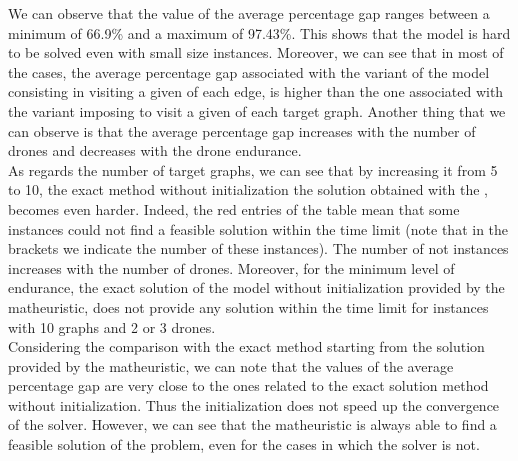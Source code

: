 We can observe that the value of the average percentage gap ranges between a minimum of 66.9\% and a maximum of 97.43\%. This shows that the model is hard to be solved even with small size instances. Moreover, we can see that in most of the cases, the average percentage gap associated with the variant of the model consisting in visiting a given  of each edge, is higher than the one associated with the variant imposing to visit a given  of each target graph. Another thing that we can observe is that the average percentage gap increases with the number of drones and decreases with the drone endurance.\\
\noindent
As regards the number of target graphs, we can see that by increasing it from 5 to 10, the exact method without initialization  the solution obtained with the , becomes even harder. Indeed, the red entries of the table mean that some instances could not find a feasible solution within the time limit (note that in the brackets we indicate the number of these instances). The number of not  instances increases with the number of drones. Moreover, for the minimum level of endurance, the exact solution of the model without initialization provided by the matheuristic, does not provide any solution within the time limit for instances with 10 graphs and 2 or 3 drones.\\
Considering the comparison with the exact method starting from the solution provided by the matheuristic, we can note that the values of the average percentage gap are very close to the ones related to the exact solution method without initialization. Thus\RE{,} the initialization does not speed up the convergence of the solver. However, we can see that the matheuristic is always able to find a feasible solution of the problem, even for the cases in which the solver is not. 






